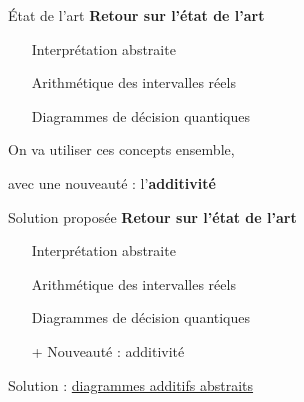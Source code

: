 \documentclass[french, 12pt]{beamer}
\begin{document}
\begin{frame}{État de l'art}
    \textbf{Retour sur l'état de l'art}
    \begin{itemize}
        \item[\checkmark] Interprétation abstraite
        \item[\checkmark] Arithmétique des intervalles réels
        \item[\checkmark] Diagrammes de décision quantiques
    \end{itemize}
    \begin{center}
        On va utiliser ces concepts ensemble,

        avec une nouveauté : l'\textbf{additivité}
\vfill
\end{center}
\end{frame}

\begin{frame}{Solution proposée}
    \textbf{Retour sur l'état de l'art}
    \begin{itemize}
        \item[\checkmark] Interprétation abstraite
        \item[\checkmark] Arithmétique des intervalles réels
        \item[\checkmark] Diagrammes de décision quantiques
        \item[+] Nouveauté : additivité
    \end{itemize}

    \begin{center}
        Solution : \underline{diagrammes additifs abstraits}
    \end{center}
\end{frame}
\end{document}
